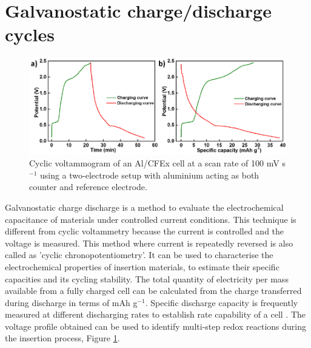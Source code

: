 \section{Galvanostatic charge/discharge cycles}
\begin{figure}[tbh!]
\centering
\includegraphics[width=\textwidth]{Figures/chap2fig/ChrononCDC}
\caption{Cyclic voltammogram of an Al/CFEx cell at a scan rate of 100 mV s$^{-1}$ using a two-electrode setup with aluminium acting as both counter and reference electrode. }
\label{Figures/chap2fig:ChrononCDC}
\end{figure}
Galvanostatic  charge  discharge  is  a  method  to  evaluate  the  electrochemical capacitance of materials under controlled current conditions. This technique is different from cyclic  voltammetry  because the current is controlled and the voltage is  measured. This  method  where current is repeatedly reversed is  also  called  as  'cyclic chronopotentiometry'. It can be used to characterise the electrochemical properties of insertion materials, to estimate their specific capacities and its cycling stability. The total quantity of electricity per mass available from a fully charged cell can be calculated from the charge transferred during discharge in terms of mAh g$^{-1}$. Specific discharge capacity is frequently measured at different discharging rates to establish rate capability of a cell \cite{pyun_electrochemistry_2012-1}. The voltage profile obtained can be used to identify multi-step redox reactions during the insertion process, Figure \ref{Figures/chap2fig:ChrononCDC}. 



